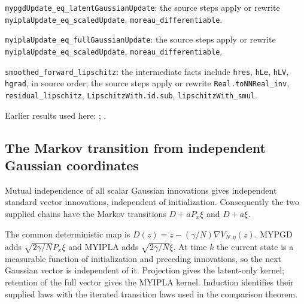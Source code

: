 \documentclass[11pt,a4paper]{report}
\begin{document}
\begin{leanbox}
\texttt{mypgd\allowbreak{}Update\_\allowbreak{}eq\_\allowbreak{}latent\allowbreak{}Gaussian\allowbreak{}Update}: the source steps apply or rewrite \texttt{myipla\allowbreak{}Update\_\allowbreak{}eq\_\allowbreak{}scaled\allowbreak{}Update}, \texttt{moreau\_\allowbreak{}differentiable}.



\texttt{myipla\allowbreak{}Update\_\allowbreak{}eq\_\allowbreak{}full\allowbreak{}Gaussian\allowbreak{}Update}: the source steps apply or rewrite \texttt{myipla\allowbreak{}Update\_\allowbreak{}eq\_\allowbreak{}scaled\allowbreak{}Update}, \texttt{moreau\_\allowbreak{}differentiable}.



\texttt{smoothed\_\allowbreak{}forward\_\allowbreak{}lipschitz}: the intermediate facts include \texttt{hres}, \texttt{h\allowbreak{}Le}, \texttt{h\allowbreak{}LV}, \texttt{hgrad}, in source order; the source steps apply or rewrite \texttt{Real.\allowbreak{}to\allowbreak{}NNReal\_\allowbreak{}inv}, \texttt{residual\_\allowbreak{}lipschitz}, \texttt{Lipschitz\allowbreak{}With.\allowbreak{}id.\allowbreak{}sub}, \texttt{lipschitz\allowbreak{}With\_\allowbreak{}smul}.
\end{leanbox}


Earlier results used here: \cite[Section~3.1.1]{LangevinLean2026IPLA}; \cite[Section~3.1.4]{LangevinLean2026IPLA}.
\subsection{\texorpdfstring{The Markov transition from independent Gaussian coordinates}{The Markov transition from independent Gaussian coordinates}}
\label{report-step-ProximalLangevin-MYPGDAlgorithm-lean-3}


Mutual independence of all scalar Gaussian innovations gives independent standard vector innovations, independent of initialization. Consequently the two supplied chains have the Markov transitions \(D+aP_x\xi\) and \(D+a\xi\).



The common deterministic map is \(D(z)=z-(\gamma/N)\nabla V_{N,\eta}(z)\). MYPGD adds \(\sqrt{2\gamma/N}P_x\xi\) and MYIPLA adds \(\sqrt{2\gamma/N}\xi\). At time \(k\) the current state is a measurable function of initialization and preceding innovations, so the next Gaussian vector is independent of it. Projection gives the latent-only kernel; retention of the full vector gives the MYIPLA kernel. Induction identifies their supplied laws with the iterated transition laws used in the comparison theorem.
\end{document}
